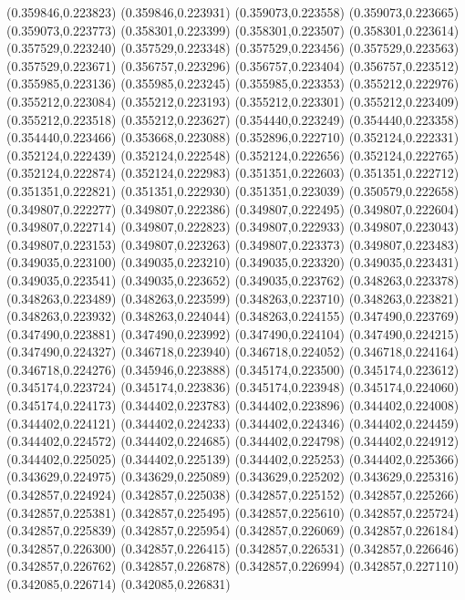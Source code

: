 (0.359846,0.223823)
(0.359846,0.223931)
(0.359073,0.223558)
(0.359073,0.223665)
(0.359073,0.223773)
(0.358301,0.223399)
(0.358301,0.223507)
(0.358301,0.223614)
(0.357529,0.223240)
(0.357529,0.223348)
(0.357529,0.223456)
(0.357529,0.223563)
(0.357529,0.223671)
(0.356757,0.223296)
(0.356757,0.223404)
(0.356757,0.223512)
(0.355985,0.223136)
(0.355985,0.223245)
(0.355985,0.223353)
(0.355212,0.222976)
(0.355212,0.223084)
(0.355212,0.223193)
(0.355212,0.223301)
(0.355212,0.223409)
(0.355212,0.223518)
(0.355212,0.223627)
(0.354440,0.223249)
(0.354440,0.223358)
(0.354440,0.223466)
(0.353668,0.223088)
(0.352896,0.222710)
(0.352124,0.222331)
(0.352124,0.222439)
(0.352124,0.222548)
(0.352124,0.222656)
(0.352124,0.222765)
(0.352124,0.222874)
(0.352124,0.222983)
(0.351351,0.222603)
(0.351351,0.222712)
(0.351351,0.222821)
(0.351351,0.222930)
(0.351351,0.223039)
(0.350579,0.222658)
(0.349807,0.222277)
(0.349807,0.222386)
(0.349807,0.222495)
(0.349807,0.222604)
(0.349807,0.222714)
(0.349807,0.222823)
(0.349807,0.222933)
(0.349807,0.223043)
(0.349807,0.223153)
(0.349807,0.223263)
(0.349807,0.223373)
(0.349807,0.223483)
(0.349035,0.223100)
(0.349035,0.223210)
(0.349035,0.223320)
(0.349035,0.223431)
(0.349035,0.223541)
(0.349035,0.223652)
(0.349035,0.223762)
(0.348263,0.223378)
(0.348263,0.223489)
(0.348263,0.223599)
(0.348263,0.223710)
(0.348263,0.223821)
(0.348263,0.223932)
(0.348263,0.224044)
(0.348263,0.224155)
(0.347490,0.223769)
(0.347490,0.223881)
(0.347490,0.223992)
(0.347490,0.224104)
(0.347490,0.224215)
(0.347490,0.224327)
(0.346718,0.223940)
(0.346718,0.224052)
(0.346718,0.224164)
(0.346718,0.224276)
(0.345946,0.223888)
(0.345174,0.223500)
(0.345174,0.223612)
(0.345174,0.223724)
(0.345174,0.223836)
(0.345174,0.223948)
(0.345174,0.224060)
(0.345174,0.224173)
(0.344402,0.223783)
(0.344402,0.223896)
(0.344402,0.224008)
(0.344402,0.224121)
(0.344402,0.224233)
(0.344402,0.224346)
(0.344402,0.224459)
(0.344402,0.224572)
(0.344402,0.224685)
(0.344402,0.224798)
(0.344402,0.224912)
(0.344402,0.225025)
(0.344402,0.225139)
(0.344402,0.225253)
(0.344402,0.225366)
(0.343629,0.224975)
(0.343629,0.225089)
(0.343629,0.225202)
(0.343629,0.225316)
(0.342857,0.224924)
(0.342857,0.225038)
(0.342857,0.225152)
(0.342857,0.225266)
(0.342857,0.225381)
(0.342857,0.225495)
(0.342857,0.225610)
(0.342857,0.225724)
(0.342857,0.225839)
(0.342857,0.225954)
(0.342857,0.226069)
(0.342857,0.226184)
(0.342857,0.226300)
(0.342857,0.226415)
(0.342857,0.226531)
(0.342857,0.226646)
(0.342857,0.226762)
(0.342857,0.226878)
(0.342857,0.226994)
(0.342857,0.227110)
(0.342085,0.226714)
(0.342085,0.226831)
